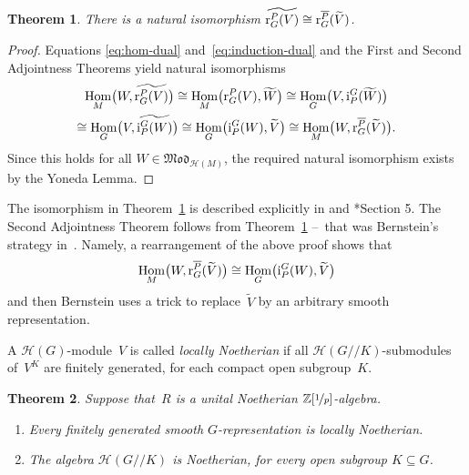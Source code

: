 \documentclass{amsart}
\newtheorem{theorem}{Theorem}[section]
\theoremstyle{remark}
\theoremstyle{definition}
\DeclareMathOperator{\Hom}{Hom}%
\newcommand*{\Jaci}{\textup i}%
\newcommand*{\Jacr}{\textup r}%
\newcommand*{\nb}{\nobreakdash}%
\newcommand*{\opp}[1]{\overline{#1}}%
\newcommand*{\Z}{\mathbb Z}%
\newcommand*{\Mod}[1]{\mathfrak{Mod}_{#1}}%
\newcommand{\ring}{R}%
\newcommand*{\Hecke}{\mathcal H}%
\begin{document}
\begin{theorem}
  \label{thm:Jacquet-restriction-dual}
  There is a natural isomorphism \(\widetilde{\Jacr_G^P (V)} \cong \Jacr_G^{\opp{P}} (\widetilde V)\).
\end{theorem}

\begin{proof}
  Equations \eqref{eq:hom-dual} and~\eqref{eq:induction-dual} and the First and Second Adjointness Theorems yield natural isomorphisms
  \begin{multline*}
    \Hom_M \bigl( W,\widetilde{\Jacr_G^P (V)} \bigr) \cong \Hom_M \bigl( \Jacr_G^P (V), \widetilde W \bigr)
    \cong \Hom_G \bigl( V,\Jaci_P^G (\widetilde W) \bigr)\\
    \cong \Hom_G \bigl( V,\widetilde{\Jaci_P^G (W)} \bigr) \cong \Hom_G \bigl( \Jaci_P^G (W),
    \widetilde{V} \bigr) \cong \Hom_M \bigl( W, \Jacr_G^{\opp{P}} (\widetilde V) \bigr).
  \end{multline*}
  Since this holds for all \(W \in \Mod{\Hecke(M)}\), the required natural isomorphism exists by the Yoneda Lemma.
\end{proof}

The isomorphism in Theorem~\ref{thm:Jacquet-restriction-dual} is described explicitly in \cite{Bernstein:Second_adjointness} and \cite{Bushnell:Localization_Hecke}*{Section 5}.  The Second Adjointness Theorem follows from Theorem~\ref{thm:Jacquet-restriction-dual} --~that was Bernstein's strategy in~\cite{Bernstein:Second_adjointness}.  Namely, a rearrangement of the above proof shows that
\[
\Hom_M \bigl(W, \Jacr_G^{\opp{P}} (\widetilde V)\bigr) \cong \Hom_G \bigl(\Jaci_P^G (W),\widetilde{V}\bigr)
\]
and then Bernstein uses a trick to replace~\(\widetilde{V}\) by an arbitrary smooth representation.

A \(\Hecke(G)\)-module~\(V\) is called \emph{locally Noetherian} if all \(\Hecke(G/\!\!/K)\)-submodules of~\(V^K\) are finitely generated, for each compact open subgroup~\(K\).

\begin{theorem}
  \label{thm:Hecke-algebra-Noetherian}
  Suppose that~\(\ring\) is a unital Noetherian \(\Z[\nicefrac1p]\)-algebra.
  \begin{enumerate}[label=\textup{(\alph{*})}]
  \item Every finitely generated smooth \(G\)\nb-representation is locally Noetherian.
  \item The algebra \(\Hecke(G/\!\!/K)\) is Noetherian, for every open subgroup \(K \subseteq G\).
  \end{enumerate}
\end{theorem}
\end{document}
